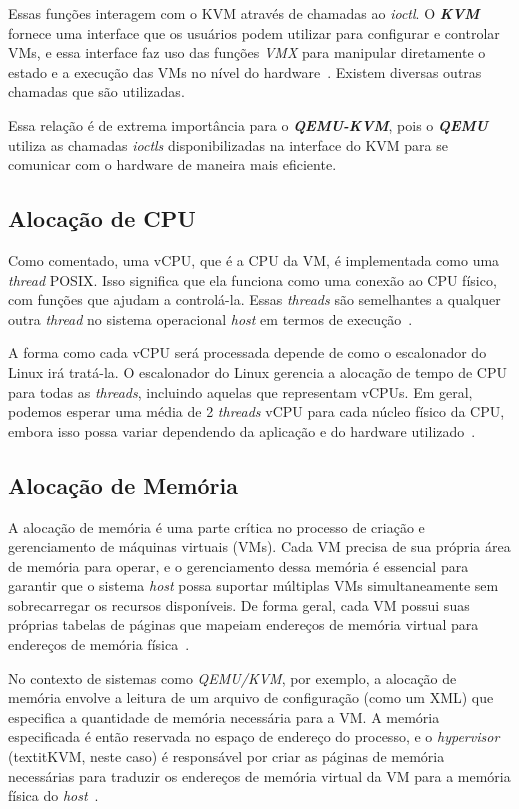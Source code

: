 Essas funções interagem com o KVM através de chamadas ao \textit{ioctl}. O \textit{\textbf{KVM}} fornece uma interface que os usuários podem utilizar para configurar e controlar VMs, e essa interface faz uso das funções \textit{VMX} para manipular diretamente o estado e a execução das VMs no nível do hardware~\citep{zabaljauregui2008hardware}. Existem diversas outras chamadas que são utilizadas.

Essa relação é de extrema importância para o \textit{\textbf{QEMU-KVM}}, pois o \textit{\textbf{QEMU}} utiliza as chamadas \textit{ioctls} disponibilizadas na interface do KVM para se comunicar com o hardware de maneira mais eficiente.

\subsection{Alocação de CPU}

Como comentado, uma vCPU, que é a CPU da VM, é implementada como uma \textit{thread} POSIX. Isso significa que ela funciona como uma conexão ao CPU físico, com funções que ajudam a controlá-la. Essas \textit{threads} são semelhantes a qualquer outra \textit{thread} no sistema operacional \textit{host} em termos de execução~\citep{chirammal2016mastering}.

A forma como cada vCPU será processada depende de como o escalonador do Linux irá tratá-la. O escalonador do Linux gerencia a alocação de tempo de CPU para todas as \textit{threads}, incluindo aquelas que representam vCPUs. Em geral, podemos esperar uma média de 2 \textit{threads} vCPU para cada núcleo físico da CPU, embora isso possa variar dependendo da aplicação e do hardware utilizado~\citep{TechTargetvCPU}.

\subsection{Alocação de Memória}

A alocação de memória é uma parte crítica no processo de criação e gerenciamento de máquinas virtuais (VMs). Cada VM precisa de sua própria área de memória para operar, e o gerenciamento dessa memória é essencial para garantir que o sistema \textit{host} possa suportar múltiplas VMs simultaneamente sem sobrecarregar os recursos disponíveis. De forma geral, cada VM possui suas próprias tabelas de páginas que mapeiam endereços de memória virtual para endereços de memória física~\citep{modernOS}.

No contexto de sistemas como \textit{QEMU/KVM}, por exemplo, a alocação de memória envolve a leitura de um arquivo de configuração (como um XML) que especifica a quantidade de memória necessária para a VM. A memória especificada é então reservada no espaço de endereço do processo, e o \textit{hypervisor} (textit{KVM}, neste caso) é responsável por criar as páginas de memória necessárias para traduzir os endereços de memória virtual da VM para a memória física do \textit{host}~\citep{chirammal2016mastering}.

